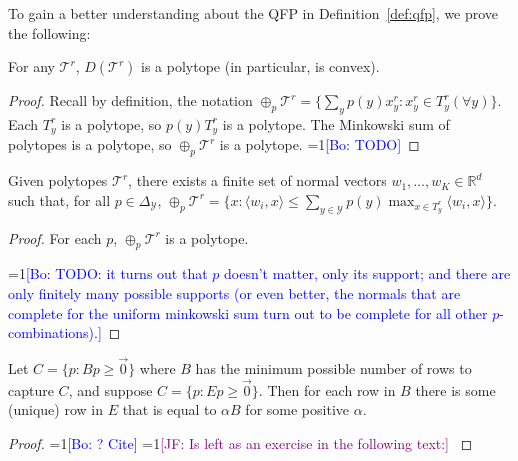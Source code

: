 \documentclass[anon]{colt2020} %
\newcommand{\Comments}{1}
\newcommand{\mynote}[2]{\ifnum\Comments=1\textcolor{#1}{#2}\fi}
\newcommand{\jessie}[1]{\mynote{purple}{[JF: #1]}}
\newcommand{\bo}[1]{\mynote{blue}{[Bo: #1]}}
\newcommand{\reals}{\mathbb{R}}
\newcommand{\simplex}{\Delta_\Y}
\newcommand{\T}{\mathcal{T}}
\newcommand{\Y}{\mathcal{Y}}
\newcommand{\inprod}[2]{\langle #1, #2 \rangle}%
\begin{document}
To gain a better understanding about the QFP in Definition~\ref{def:qfp}, we prove the following:
\begin{lemma} \label{lemma:D-polytope}
  For any $\T^r$, $D(\T^r)$ is a polytope (in particular, is convex).
\end{lemma}
\begin{proof}
   Recall by definition, the notation $\oplus_p \T^r = \{\sum_y p(y) x^r_y : x^r_y \in T^r_y (\forall y)\}$.
   Each $T^r_y$ is a polytope, so $p(y) T^r_y$ is a polytope.
   The Minkowski sum of polytopes is a polytope, so $\oplus_p \T^r$ is a polytope.
  \bo{TODO}
\end{proof}
\begin{lemma}  \label{lemma:minkowski-support}
  Given polytopes $\T^r$, there exists a finite set of normal vectors $w_1,\ldots,w_K \in \reals^d$ such that, for all $p \in \simplex$, $\oplus_p \T^r = \{x : \inprod{w_i}{x} \leq \sum_{y \in \Y} p(y) \max_{x \in T^r_y} \inprod{w_i}{x} \}$.
\end{lemma}
\begin{proof}
   For each $p$, $\oplus_p \T^r$ is a polytope.

  \bo{TODO: it turns out that $p$ doesn't matter, only its support; and there are only finitely many possible supports (or even better, the normals that are complete for the uniform minkowski sum turn out to be complete for all other $p$-combinations).}
\end{proof}
\begin{lemma} \label{lemma:E-to-B}
  Let $C = \{p : Bp \geq \vec 0 \}$ where $B$ has the minimum possible number of rows to capture $C$, and suppose $C = \{p : Ep \geq \vec 0 \}$.
  Then for each row in $B$ there is some (unique) row in $E$ that is equal to $\alpha B$ for some positive $\alpha$.
\end{lemma}
\begin{proof}
  \bo{? Cite} \jessie{Is left as an exercise in the following text:} \cite[Exercise 2.15]{ziegler2012lectures}
\end{proof}
\end{document}
